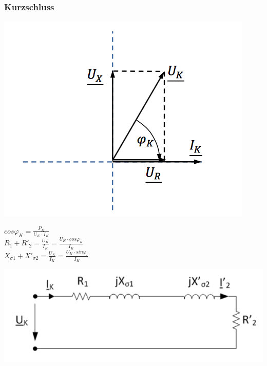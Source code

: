 \subsubsection{Kurzschluss}
\begin{minipage}{0.3 \linewidth}
\includegraphics[width = \linewidth]{./Pics/VL1213/ZeigerdiagrammKurz}
\end{minipage}
\begin{minipage}{0.4 \linewidth}
$cos \varphi_K = \frac{P_K}{U_K \cdot I_K}$ \\

$R_{1} + R'_2 = \frac{U_K}{I_K} = \frac{U_K \cdot cos\varphi_K}{I_K}$ \\

$X_{\sigma 1} + X'_{\sigma 2} = \frac{U_X}{I_K} = \frac{U_K \cdot sin\varphi_l}{I_K}$\\
\end{minipage}
\begin{minipage}{0.3 \linewidth}
\includegraphics[width = \linewidth]{./Pics/VL1213/Kurzschluss}
\end{minipage}

